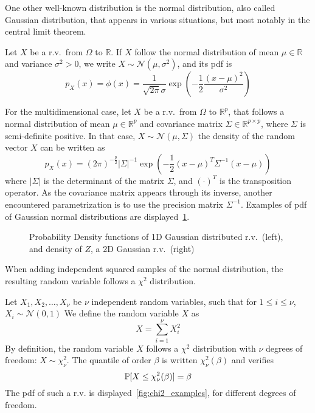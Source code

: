 \documentclass[../../Main_ManuscritThese.tex]{subfiles}
\newcommand\imgpath{/home/victor/acadwriting/Manuscrit/Text/Chapter2/img/}
\begin{document}
One other well-known distribution is the normal distribution,
also called Gaussian distribution, that appears in various situations,
but most notably in the central limit theorem.
\begin{example}
  \label{ex:gaussian_distribution}
  Let $X$ be a r.v.\ from $\Omega$ to $\mathbb{R}$.  If $X$ follow the
  normal distribution of mean $\mu \in \mathbb{R}$ and variance
  $\sigma^2>0$, we write $X \sim \mathcal{N}(\mu,\sigma^2)$, and its
  pdf is
  \begin{equation}
    p_X(x) = \phi(x) = \frac{1}{\sqrt{2\pi}\sigma}\exp\left(-\frac{1}{2}\frac{(x-\mu)^2}{\sigma^2}\right)
  \end{equation}

  For the multidimensional case, let $X$ be a r.v.\ from $\Omega$ to
  $\mathbb{R}^p$, that follows a normal distribution of mean
  $\mu \in \mathbb{R}^p$ and covariance matrix
  $\Sigma \in \mathbb{R}^{p\times p}$, where $\Sigma$ is semi-definite
  positive.  In that case, $X\sim \mathcal{N}(\mu, \Sigma)$ the
  density of the random vector $X$ can be written as
\begin{equation}
    p_X(x) = (2\pi)^{-\frac{p}{2}}\lvert\Sigma\rvert^{-1}\exp\left(-\frac{1}{2}(x-\mu)^T\Sigma^{-1}(x-\mu)\right)
  \end{equation}
  where $|\Sigma|$ is the determinant of the matrix $\Sigma$, and
  $(\cdot)^T$ is the transposition operator.  As the covariance matrix
  appears through its inverse, another encountered parametrization is
  to use the precision matrix $\Sigma^{-1}$.  Examples of pdf of
  Gaussian normal distributions are
  displayed~\cref{fig:example_normal}.
\end{example}
\begin{figure}[!h]
  \centering
  
  \caption[Probability Density functions of 1D and 2D Gaussian r.v.]{Probability Density functions of 1D Gaussian distributed r.v.\ (left), and density of $Z$, a 2D Gaussian r.v.\ (right)}
  \label{fig:example_normal}
\end{figure}
When adding independent squared samples of the normal distribution,
the resulting random variable follows a $\chi^2$ distribution.
\begin{example}
  \label{ex:chi2}
  Let $X_1, X_2,\dots,X_{\nu}$ be $\nu$ independent random variables,
  such that for $1\leq i \leq \nu$, $X_i \sim \mathcal{N}(0,1)$ We
  define the random variable $X$ as
  \begin{equation}
    X = \sum_{i=1}^\nu X_i^2
  \end{equation}
  By definition, the random variable $X$ follows a $\chi^2$ distribution with $\nu$ degrees of freedom: $X\sim \chi^2_{\nu}$. The quantile of order $\beta$ is written $\chi^2_{\nu}(\beta)$ and verifies
  \begin{equation}
    \mathbb{P}[X \leq \chi^2_{\nu}(\beta)] = \beta 
  \end{equation}
  The pdf of such a r.v. is displayed~\cref{fig:chi2_examples}, for different degrees of freedom.
\end{example}
\end{document}

